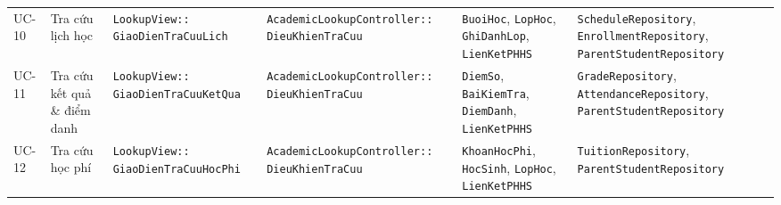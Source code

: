 \documentclass[11pt,a4paper]{report}
\begin{document}
\begin{landscape}
\begin{table}[p]
\begin{tabularx}{\linewidth}{@{}l >{\raggedright\arraybackslash}p{3.2cm} >{\raggedright\arraybackslash}p{4.2cm} >{\raggedright\arraybackslash}p{4.6cm} >{\raggedright\arraybackslash}p{4.8cm} >{\raggedright\arraybackslash}X@{}}
    UC-10 & Tra cứu lịch học & \texttt{LookupView::} \newline \texttt{GiaoDienTraCuuLich} & \texttt{AcademicLookupController::} \newline \texttt{DieuKhienTraCuu} & \texttt{BuoiHoc}, \texttt{LopHoc}, \newline \texttt{GhiDanhLop}, \texttt{LienKetPHHS} & \texttt{ScheduleRepository}, \newline \texttt{EnrollmentRepository}, \newline \texttt{ParentStudentRepository} \\
    UC-11 & Tra cứu kết quả \& điểm danh & \texttt{LookupView::} \newline \texttt{GiaoDienTraCuuKetQua} & \texttt{AcademicLookupController::} \newline \texttt{DieuKhienTraCuu} & \texttt{DiemSo}, \texttt{BaiKiemTra}, \newline \texttt{DiemDanh}, \texttt{LienKetPHHS} & \texttt{GradeRepository}, \newline \texttt{AttendanceRepository}, \newline \texttt{ParentStudentRepository} \\
    UC-12 & Tra cứu học phí & \texttt{LookupView::} \newline \texttt{GiaoDienTraCuuHocPhi} & \texttt{AcademicLookupController::} \newline \texttt{DieuKhienTraCuu} & \texttt{KhoanHocPhi}, \texttt{HocSinh}, \newline \texttt{LopHoc}, \texttt{LienKetPHHS} & \texttt{TuitionRepository}, \newline \texttt{ParentStudentRepository} \\
    \bottomrule
  \end{tabularx}
\end{table}
\clearpage
\end{landscape}
%
\end{document}
